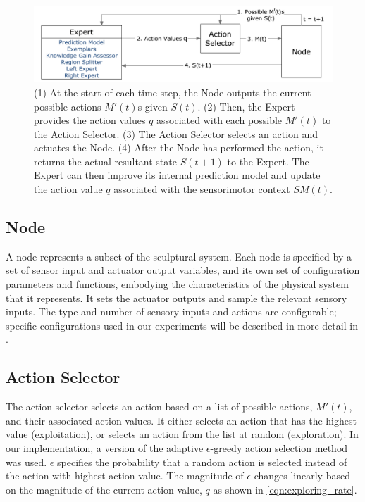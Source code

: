 \begin{figure}[htb]
	\centering
	\includegraphics[width=1.0 \textwidth]{"fig/cbla/Block Diagram CBLA"}
	\caption[Block diagram of the Curiosity Based Learning Algorithm]{(1) At the start of each time step, the Node outputs the current possible actions $M'(t)$s given $S(t)$. (2) Then, the Expert provides the action values $q$ associated with each possible $M'(t)$ to the Action Selector. (3) The Action Selector selects an action and actuates the Node. (4) After the Node has performed the action, it returns the actual resultant state $S(t+1)$ to the Expert. The Expert can then improve its internal prediction model and update the action value $q$ associated with the sensorimotor context $SM(t)$. }
	\label{fig:Block Diagram CBLA}
\end{figure}


\FloatBarrier
\subsection{Node}
A node represents a subset of the sculptural system. Each node is specified by a set of sensor input and actuator output variables, and its own set of configuration parameters and functions, embodying the characteristics of the physical system that it represents. It sets the actuator outputs and sample the relevant sensory inputs.  The type and number of sensory inputs and actions are configurable; specific configurations used in our experiments will be described in more detail in .

\subsection{Action Selector}

The action selector selects an action based on a list of possible actions, $M'(t)$, and their associated action values. It either selects an action that has the highest value (exploitation), or selects an action from the list at random (exploration). In our implementation, a version of the adaptive $\epsilon$-greedy \cite{Tokic2010} action selection method was used. $\epsilon$ specifies the probability that a random action is selected instead of the action with highest action value. The magnitude of $\epsilon$ changes linearly based on the magnitude of the current action value, $q$ as shown in \eqref{eqn:exploring_rate}. 

